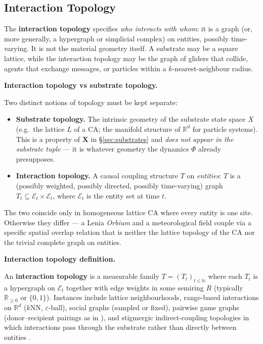 \documentclass[journal]{IEEEtran}
\theoremstyle{plain}
\theoremstyle{definition}
\theoremstyle{plain}
\newcounter{topic}[subsection]
\newcommand{\topic}[1]{%
  \refstepcounter{topic}%
  \par\smallskip\noindent\textbf{#1.}\ }
\newcommand{\R}{\mathbb{R}}
\newcommand{\N}{\mathbb{N}}
\newcommand{\X}{\mathbf{X}}
\begin{document}
\subsection{Interaction Topology}\label{sec:topology}

The \textbf{interaction topology} specifies \emph{who interacts with whom}:
it is a graph (or, more generally, a hypergraph or simplicial complex) on
entities, possibly time-varying. It is not the material geometry itself. A
substrate may be a square lattice, while the interaction topology may be the
graph of gliders that collide, agents that exchange messages, or particles
within a $k$-nearest-neighbour radius.

\topic{Interaction topology vs substrate topology}

Two distinct notions of topology must be kept separate:

\begin{itemize}[leftmargin=1.5em,itemsep=2pt]
  \item \textbf{Substrate topology.} The intrinsic geometry of the substrate
    state space $X$ (e.g.\ the lattice $L$ of a CA; the manifold structure of
    $\R^d$ for particle systems). This is a property of $\X$ in
    \S\ref{sec:substrates} and \emph{does not appear in the substrate
    tuple} --- it is
    whatever geometry the dynamics $\Phi$ already presupposes.
  \item \textbf{Interaction topology.} A causal coupling structure $T$ on
    \emph{entities}: $T$ is a (possibly weighted, possibly directed,
    possibly time-varying) graph
    $T_t \subseteq \mathcal{E}_t \times \mathcal{E}_t$, where
    $\mathcal{E}_t$ is the entity set at time $t$.
\end{itemize}

The two coincide only in homogeneous lattice CA where every entity is one
site. Otherwise they differ --- a Lenia \emph{Orbium} and a meteorological
field couple via a specific spatial overlap relation that is neither the
lattice topology of the CA nor the trivial complete graph on entities.

\topic{Interaction topology definition}

An \textbf{interaction topology} is a measurable family $T = (T_t)_{t\in\N}$
where each $T_t$ is a hypergraph on $\mathcal{E}_t$ together with edge
weights in some semiring $R$ (typically $\R_{\geq 0}$ or $\{0,1\}$).
Instances include lattice neighbourhoods, range-based interactions on $\R^d$
($k$NN, $\varepsilon$-ball), social graphs (sampled or fixed), pairwise game
graphs (donor--recipient pairings as in \cite{vallinder2024cultural}), and
stigmergic indirect-coupling topologies in which interactions pass through
the substrate rather than directly between entities \cite{grasse1959stigmergie}.
\end{document}

